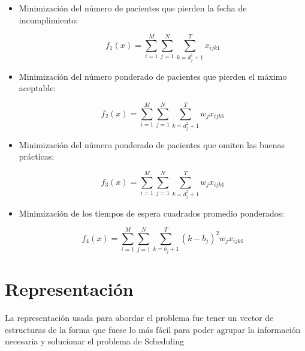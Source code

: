 \documentclass[letter, 10pt]{article}
\begin{document}
\begin{itemize}

    \item Minimización del número de pacientes que pierden la fecha de incumplimiento:

    \begin{center}
        $$f_{1}(x) = \sum_{i=1}^{M}\sum_{j=1}^{N}\sum_{k=d_{j}^{1}+1}^T x_{ijk1}$$
    \end{center}

    \item Minimización del número ponderado de pacientes que pierden el máximo aceptable:

    \begin{center}
        $$f_{2}(x) = \sum_{i=1}^{M}\sum_{j=1}^{N}\sum_{k=d_{j}^{2}+1}^T w_{j}x_{ijk1}$$
    \end{center}

    \item Minimización del número ponderado de pacientes que omiten las buenas prácticas:

    \begin{center}
        $$f_{3}(x) = \sum_{i=1}^{M}\sum_{j=1}^{N}\sum_{k=d_{j}^{3}+1}^T w_{j}x_{ijk1}$$
    \end{center}

    \item Minimización de los tiempos de espera cuadrados promedio ponderados:

    \begin{center}
        $$f_{4}(x) = \sum_{i=1}^{M}\sum_{j=1}^{N}\sum_{k=b_{j}+1}^T (k-b_{j})^{2}w_{j}x_{ijk1}$$
    \end{center}

\end{itemize}

\newpage

\section{Representación}

La representación usada para abordar el problema fue tener un vector de estructuras de la forma que fuese lo más fácil para poder agrupar la información necesaria y solucionar el problema de Scheduling
\end{document}
